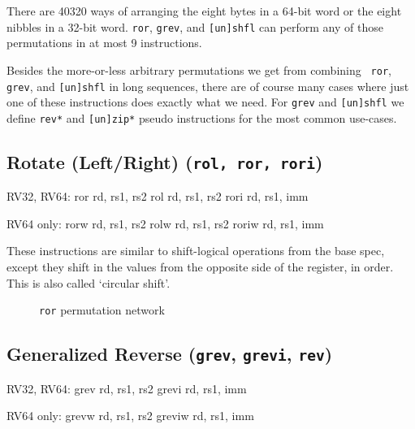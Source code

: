 There are 40320 ways of arranging the eight bytes in a 64-bit word or the eight
nibbles in a 32-bit word. {\tt ror}, {\tt grev}, and {\tt [un]shfl} can perform
any of those permutations in at most 9 instructions.~\cite{Wolf19A}

Besides the more-or-less arbitrary permutations we get from combining {\tt
ror}, {\tt grev}, and {\tt [un]shfl} in long sequences, there are of course
many cases where just one of these instructions does exactly what we need.
For {\tt grev} and {\tt [un]shfl} we define {\tt rev*} and {\tt [un]zip*}
pseudo instructions for the most common use-cases.


\subsection{Rotate (Left/Right) (\texttt{rol,\ ror,\ rori})}

\begin{rvb}
  RV32, RV64:
    ror  rd, rs1, rs2
    rol  rd, rs1, rs2
    rori rd, rs1, imm

  RV64 only:
    rorw  rd, rs1, rs2
    rolw  rd, rs1, rs2
    roriw rd, rs1, imm
\end{rvb}

These instructions are similar to shift-logical operations from the base
spec, except they shift in the values from the opposite side of the
register, in order. This is also called `circular shift'.




\begin{figure}[t]
\begin{center}

\end{center}
\caption{\texttt{ror} permutation network}
\label{permnet-ror}
\end{figure}

\subsection{Generalized Reverse (\texttt{grev}, \texttt{grevi}, \texttt{rev})}
\label{grev}

\begin{rvb}
  RV32, RV64:
    grev  rd, rs1, rs2
    grevi rd, rs1, imm

  RV64 only:
    grevw  rd, rs1, rs2
    greviw rd, rs1, imm
\end{rvb}

